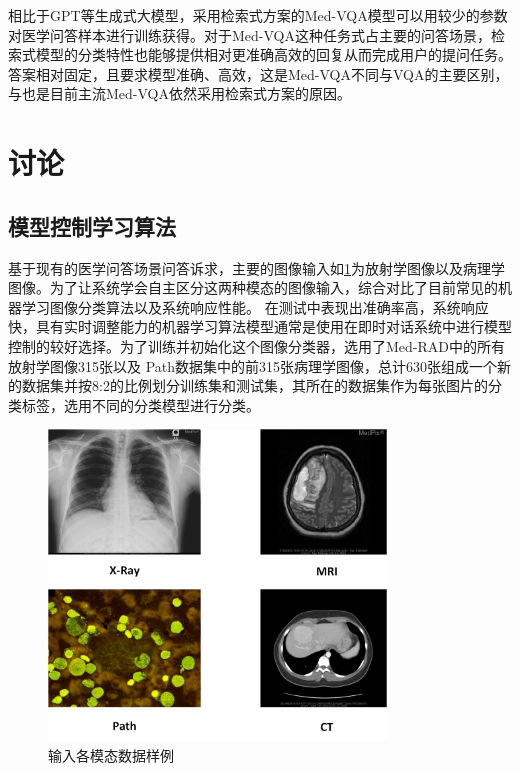 相比于GPT等生成式大模型，采用检索式方案的Med-VQA模型可以用较少的参数对医学问答样本进行训练获得。对于Med-VQA这种任务式占主要的问答场景，检索式模型的分类特性也能够提供相对更准确高效的回复从而完成用户的提问任务。答案相对固定，且要求模型准确、高效，这是Med-VQA不同与VQA的主要区别，
与也是目前主流Med-VQA依然采用检索式方案的原因。

\section{讨论}
\subsection{模型控制学习算法}
基于现有的医学问答场景问答诉求，主要的图像输入如\ref{dataexm}为放射学图像以及病理学图像。为了让系统学会自主区分这两种模态的图像输入，综合对比了目前常见的机器学习图像分类算法以及系统响应性能。
在测试中表现出准确率高，系统响应快，具有实时调整能力的机器学习算法模型通常是使用在即时对话系统中进行模型控制的较好选择。为了训练并初始化这个图像分类器，选用了Med-RAD中的所有放射学图像315张以及
Path数据集中的前315张病理学图像，总计630张组成一个新的数据集并按8:2的比例划分训练集和测试集，其所在的数据集作为每张图片的分类标签，选用不同的分类模型进行分类。
\begin{figure}[htbp]
	\centering	
	\includegraphics[width=0.8\textwidth]{Fig/myfig/chapter5/dataexm.png}  %
	\caption{\label{dataexm}输入各模态数据样例} 
\end{figure}

